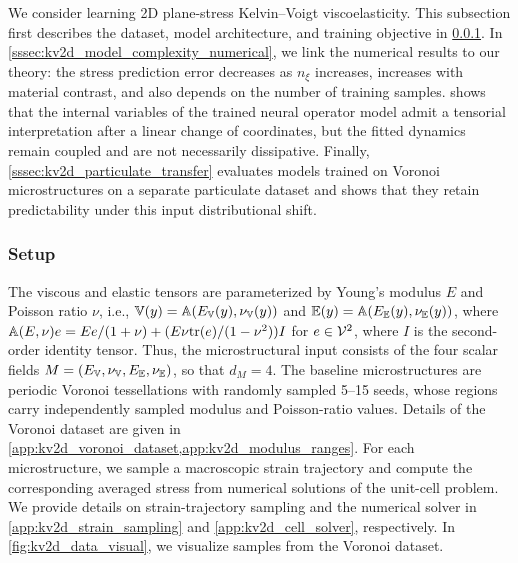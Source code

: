 \documentclass[3p, 12pt, preprint]{elsarticle}
\begin{document}
We consider learning 2D plane-stress Kelvin--Voigt viscoelasticity. This subsection first describes the dataset, model architecture, and training objective in \cref{sssec:kv2d_setup}. In \cref{sssec:kv2d_model_complexity_numerical}, we link the numerical results to our theory: the stress prediction error decreases as $n_{\xi}$ increases, increases with material contrast, and also depends on the number of training samples.  shows that the internal variables of the trained neural operator model admit a tensorial interpretation after a linear change of coordinates, but the fitted dynamics remain coupled and are not necessarily dissipative. Finally, \cref{sssec:kv2d_particulate_transfer} evaluates models trained on Voronoi microstructures on a separate particulate dataset and shows that they retain predictability under this input distributional shift.

\subsubsection{Setup}\label{sssec:kv2d_setup}
The viscous and elastic tensors are parameterized by Young's modulus $E$ and Poisson ratio $\nu$, i.e., $\mathbb{V}(y)=\mathbb{A}(E_{\mathbb{V}}(y),\nu_{\mathbb{V}}(y))$ and $\mathbb{E}(y)=\mathbb{A}(E_{\mathbb{E}}(y),\nu_{\mathbb{E}}(y))$, where $\mathbb{A}(E,\nu)e = Ee/(1+\nu) + (E\nu{\operatorname{tr}}(e)/(1-\nu^2)){I}$ for $e\in{\mathcal{V}}^2$, where {$I$} is the second-order identity tensor. Thus, the microstructural input consists of the four scalar fields $M=(E_{\mathbb{V}},\nu_{\mathbb{V}},E_{\mathbb{E}},\nu_{\mathbb{E}})$, so that $d_M=4$. The baseline microstructures are periodic Voronoi tessellations with randomly sampled 5--15 seeds, whose regions carry independently sampled modulus and Poisson-ratio values. Details of the Voronoi dataset are given in \cref{app:kv2d_voronoi_dataset,app:kv2d_modulus_ranges}. For each microstructure, we sample a macroscopic strain trajectory and compute the corresponding averaged stress from numerical solutions of the unit-cell problem. We provide details on strain-trajectory sampling and the numerical solver in \cref{app:kv2d_strain_sampling} and \cref{app:kv2d_cell_solver}, respectively.  In \cref{fig:kv2d_data_visual}, we visualize samples from the Voronoi dataset.
\end{document}
